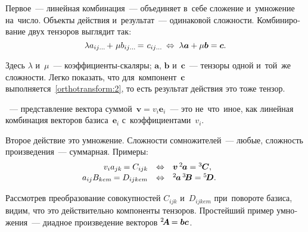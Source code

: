 \begin{otherlanguage}{russian}

Первое~--- линейная комбинация~--- объединяет в~себе сложение и~умножение на~число. Объекты действия и~результат~--- одинаковой сложности. Комбинирование двух тензоров выглядит так:
\vspace{-1em}\begin{equation}\label{action:1}
\lambda a_{ij\ldots} \hspace{-0.2ex} + \hspace{0.2ex} \mu b_{ij\ldots} \hspace{-0.2ex} = \hspace{0.2ex} c_{ij\ldots} \hspace{-0.2ex} \;\Leftrightarrow\; \lambda \bm{a} + \mu \bm{b} = \bm{c}.
\end{equation}\vspace{-1.4em}

\noindent Здесь $\lambda$ и~$\mu$~--- коэффициенты\hbox{-}скаляры; $\bm{a}$, $\bm{b}$ и~$\bm{c}$~--- тензоры одной и~той~же сложности. Легко показать, что для~компонент~$\bm{c}$ выполняется~\eqref{orthotransform:2}, то есть результат действия это тоже тензор.

~--- представление вектора суммой~${\bm{v} = v_i \bm{e}_i}$~--- это не~что~иное, как линейная комбинация векторов базиса~${\bm{e}_i}$ с~коэффициентами~${v_i}$.

Второе действие это умножение. Сложности сомножителей~--- любые, сложность произведения~--- суммарная. Примеры:
\begin{equation}\label{action:2}
\begin{array}{rcl}
v_i a_{jk} \hspace{-0.16ex} = C_{ijk} & \Leftrightarrow & \bm{v} \, {^2\hspace{-0.2ex}\bm{a}} = {^3\!\!\;\bm{C}},\\[0.1em]
a_{ij} B_{kem} \hspace{-0.16ex} = D_{ijkem} & \Leftrightarrow & {^2\hspace{-0.2ex}\bm{a}} \, {^3\!\!\,\bm{B}} = {^5\!\!\,\bm{D}}.
\end{array}\hspace{1.5em}
\end{equation}

\vspace{-0.1em} Рассмотрев преобразование совокупностей ${C_{ijk}}$ и~${D_{ijkem}}$ при~повороте базиса, видим, что это действительно компоненты тензоров. Простейший пример умножения~--- диадное произведение векторов ${^2\hspace{-0.2em}\bm{A} \hspace{-0.15ex} = \bm{b}\bm{c}}$.


\end{otherlanguage}
